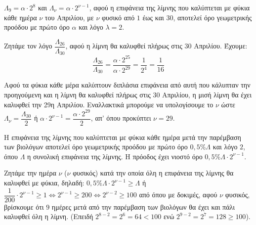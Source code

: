 
\begin{alist}
\item $\Lambda_9 = \alpha \cdot 2^8$ και $\Lambda_\nu = \alpha \cdot 2^{\nu-1}$, αφού η επιφάνεια της λίμνης που καλύπτεται με φύκια κάθε ημέρα $\nu$ του Απριλίου, με $\nu$ φυσικό από $1$ έως και $30$, αποτελεί όρο γεωμετρικής προόδου με πρώτο όρο $\alpha$ και λόγο $\lambda=2$.

\item Ζητάμε τον λόγο $\dfrac{\Lambda_{26}}{\Lambda_{30}}$, αφού η λίμνη θα καλυφθεί πλήρως στις 30 Απριλίου. Έχουμε:
\[\dfrac{\Lambda_{26}}{\Lambda_{30}} = \dfrac{\alpha \cdot 2^{25}}{\alpha \cdot 2^{29}} = \dfrac{1}{2^4} = \dfrac{1}{16}\]

\item Αφού τα φύκια κάθε μέρα καλύπτουν διπλάσια επιφάνεια από αυτή που κάλυπταν την προηγούμενη και η λίμνη θα καλυφθεί πλήρως στις 30 Απριλίου, η μισή λίμνη θα έχει καλυφθεί την 29η Απριλίου. Εναλλακτικά μπορούμε να υπολογίσουμε το $\nu$ ώστε $\Lambda_\nu = \dfrac{\Lambda_{30}}{2}$ ή  $\alpha \cdot 2^{\nu-1} = \dfrac{\alpha \cdot 2^{29}}{2}$, απ' όπου προκύπτει $\nu = 29$.

\item Η επιφάνεια της λίμνης που καλύπτεται με φύκια κάθε ημέρα μετά την παρέμβαση των βιολόγων αποτελεί όρο γεωμετρικής προόδου με πρώτο όρο $0,5\% \Lambda$ και λόγο $2$, όπου $\Lambda$ η συνολική επιφάνεια της λίμνης. Η πρόοδος έχει νιοστό όρο $0,5\% \Lambda \cdot 2^{\nu-1}$.

Ζητάμε την ημέρα $\nu$ ($\nu$ φυσικός) κατά την οποία όλη η επιφάνεια της λίμνης θα καλυφθεί με φύκια, δηλαδή: $0,5\% \Lambda \cdot 2^{\nu-1} \ge \Lambda$ ή $\dfrac{1}{200} \cdot 2^{\nu-1} \ge 1 \Leftrightarrow 2^{\nu-1} \ge 200 \Leftrightarrow 2^{\nu-2} \ge 100$ από όπου με δοκιμές, αφού $\nu$ φυσικός, βρίσκουμε ότι $9$ ημέρες μετά από την παρέμβαση των βιολόγων θα έχει και πάλι καλυφθεί όλη η λίμνη. (Επειδή $2^{8-2} = 2^6 = 64 < 100$ ενώ $2^{9-2} = 2^7 = 128 \ge 100$).
\end{alist}

